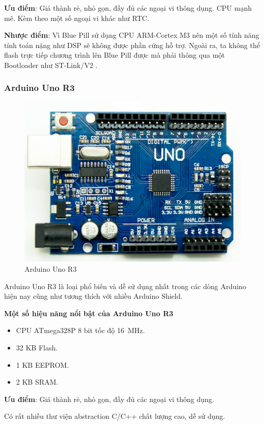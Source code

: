 \textbf{Ưu điểm}: Giá thành rẻ, nhỏ gọn, đầy đủ các ngoại vi thông dụng. CPU mạnh mẽ. Kèm theo một số ngoại vi khác như RTC.

\textbf{Nhược điểm}: Vì Blue Pill sử dụng CPU ARM-Cortex M3 nên một số tính năng tính toán nặng như DSP sẽ không được phần cứng hỗ trợ. Ngoài ra, ta không thể flash trực tiếp chương trình lên Blue Pill được mà phải thông qua một Bootloader như ST-Link/V2 \cite{stlinkv2_datasheet}.

\subsubsection{Arduino Uno R3}
\begin{figure}[ht]
\centering
\includegraphics[scale=0.75]{images/Arduino-Uno-R3-SMD.jpg}
\caption{Arduino Uno R3}
\end{figure}

Arduino Uno R3 \cite{arduino_datasheet} là loại phổ biến và dễ sử dụng nhất trong các dòng Arduino hiện nay cũng như tương thích với nhiều Arduino Shield.

\textbf{Một số hiệu năng nổi bật của Arduino Uno R3}
\begin{itemize}
    \item CPU ATmega328P 8 bit tốc độ \si{16\MHz}.
    \item 32 KB Flash.
    \item 1 KB EEPROM.
    \item 2 KB SRAM.
\end{itemize}

\textbf{Ưu điểm}: Giá thành rẻ, nhỏ gọn, đầy đủ các ngoại vi thông dụng.

Có rất nhiều thư viện abstraction C/C++ chất lượng cao, dễ sử dụng.

